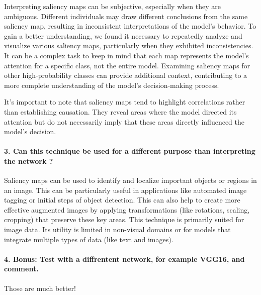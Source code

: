 Interpreting saliency maps can be subjective, especially when they are ambiguous. Different individuals may draw different conclusions from the same saliency map, resulting in inconsistent interpretations of the model's behavior. To gain a better understanding, we found it necessary to repeatedly analyze and visualize various saliency maps, particularly when they exhibited inconsistencies. It can be a complex task to keep in mind that each map represents the model's attention for a specific class, not the entire model. Examining saliency maps for other high-probability classes can provide additional context, contributing to a more complete understanding of the model's decision-making process.

It's important to note that saliency maps tend to highlight correlations rather than establishing causation. They reveal areas where the model directed its attention but do not necessarily imply that these areas directly influenced the model's decision.

\paragraph*{3. Can this technique be used for a different purpose than interpreting the network ?}
Saliency maps can be used to identify and localize important objects or regions in an image. This can be particularly useful in applications like automated image tagging or initial steps of object detection. This can also  help to create more effective augmented images by applying transformations (like rotations, scaling, cropping) that preserve these key areas. This technique is primarily suited for image data. Its utility is limited in non-visual domains or for models that integrate multiple types of data (like text and images).


\paragraph*{4. \textbf{Bonus:} Test with a diffrentent network, for example VGG16, and comment.}
Those are much better! 


